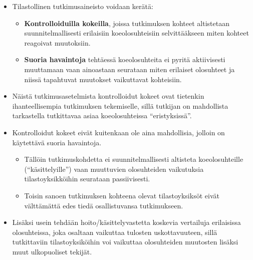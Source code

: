 \documentclass[
]{book}
\providecommand{\tightlist}{%
  \setlength{\itemsep}{0pt}\setlength{\parskip}{0pt}}
\begin{document}
\begin{itemize}
\item
  Tilastollinen tutkimusaineisto voidaan kerätä:

  \begin{itemize}
  \tightlist
  \item
    \textbf{Kontrolloiduilla kokeilla}, joissa tutkimuksen kohteet altistetaan suunnitelmallisesti erilaisiin koeolosuhteisiin selvittääkseen miten kohteet reagoivat muutoksiin.
  \item
    \textbf{Suoria havaintoja} tehtäessä koeolosuhteita ei pyritä aktiivisesti muuttamaan vaan ainoastaan seurataan miten erilaiset olosuhteet ja niissä tapahtuvat muutokset vaikuttavat kohteisiin.
  \end{itemize}
\item
  Näistä tutkimusasetelmista kontrolloidut kokeet ovat tietenkin ihanteellisempia tutkimuksen tekemiselle, sillä tutkijan on mahdollista tarkastella tutkittavaa asiaa koeolosuhteissa ``eristyksissä''.
\item
  Kontrolloidut kokeet eivät kuitenkaan ole aina mahdollisia, jolloin on käytettävä suoria havaintoja.

  \begin{itemize}
  \tightlist
  \item
    Tällöin tutkimuskohdetta ei suunnitelmallisesti altisteta koeolosuhteille (``käsittelyille'') vaan muuttuvien olosuhteiden vaikutuksia tilastoyksikköihin seurataan passiivisesti.
  \item
    Toisin sanoen tutkimuksen kohteena olevat tilastoyksiksöt eivät välttämättä edes tiedä osallistuvansa tutkimukseen.
  \end{itemize}
\item
  Lisäksi usein tehdään hoito/käsittelyvastetta koskevia vertailuja erilaisissa olosuhteissa, joka osaltaan vaikuttaa tulosten uskottavuuteen, sillä tutkittaviin tilastoyksiköihin voi vaikuttaa olosuhteiden muutosten lisäksi muut ulkopuoliset tekijät.


\end{itemize}
\end{document}
